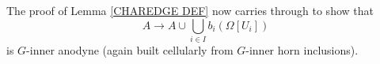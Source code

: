 \documentclass[a4paper,10pt
,draft
]{article}%
\begin{document}
\begin{remark}
The proof of Lemma \ref{CHAREDGE DEF} now carries through to show that 
\begin{equation}
	A \to A \cup \bigcup_{i \in I} b_i(\Omega[U_i])
\end{equation}
is $G$-inner anodyne (again built cellularly from $G$-inner horn inclusions).
\end{remark}


\end{document}
